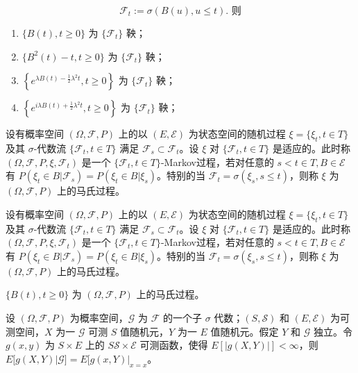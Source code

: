 \documentclass[lang=cn,10pt,thmcnt=section]{elegantbook}
\begin{document}
\begin{theorem}
	\[
\mathcal{F}_t := \sigma(B(u), u \leq t). \text{ 则}
\]
\begin{enumerate}
    \item $\{B(t), t \geq 0\}$ 为 $\{\mathcal{F}_t\}$ 鞅；
    \item $\{B^2(t) - t, t \geq 0\}$ 为 $\{\mathcal{F}_t\}$ 鞅；
    \item $\left\{e^{\lambda B(t) - \frac{1}{2} \lambda^2 t}, t \geq 0\right\}$ 为 $\{\mathcal{F}_t\}$ 鞅；
    \item $\left\{e^{i \lambda B(t) + \frac{1}{2} \lambda^2 t}, t \geq 0\right\}$ 为 $\{\mathcal{F}_t\}$ 鞅；
\end{enumerate}
\end{theorem}
\begin{definition}
	设有概率空间 $(\Omega, \mathcal{F}, P)$ 上的以 $(E, \mathcal{E})$ 为状态空间的随机过程 $\xi = \{\xi_t, t \in T\}$ 及其 $\sigma$-代数流 $\{\mathcal{F}_t, t \in T\}$ 满足 $\mathcal{F}_s \subset \mathcal{F}_t$。设 $\xi$ 对 $\{\mathcal{F}_t, t \in T\}$ 是适应的。此时称 $(\Omega, \mathcal{F}, P, \xi, \mathcal{F}_t)$ 是一个 $\{\mathcal{F}_t, t \in T\}$-Markov过程，若对任意的 $s < t \in T, B \in \mathcal{E}$ 有 $P(\xi_t \in B | \mathcal{F}_s) = P(\xi_t \in B | \xi_s)$。特别的当 $\mathcal{F}_t = \sigma(\xi_s, s \leq t)$，则称 $\xi$ 为 $(\Omega, \mathcal{F}, P)$ 上的马氏过程。
\end{definition}
\begin{definition}
	设有概率空间 $(\Omega, \mathcal{F}, P)$ 上的以 $(E, \mathcal{E})$ 为状态空间的随机过程 $\xi = \{\xi_t, t \in T\}$ 及其 $\sigma$-代数流 $\{\mathcal{F}_t, t \in T\}$ 满足 $\mathcal{F}_s \subset \mathcal{F}_t$。设 $\xi$ 对 $\{\mathcal{F}_t, t \in T\}$ 是适应的。此时称 $(\Omega, \mathcal{F}, P, \xi, \mathcal{F}_t)$ 是一个 $\{\mathcal{F}_t, t \in T\}$-Markov过程，若对任意的 $s < t \in T, B \in \mathcal{E}$ 有 $P(\xi_t \in B | \mathcal{F}_s) = P(\xi_t \in B | \xi_s)$。特别的当 $\mathcal{F}_t = \sigma(\xi_s, s \leq t)$，则称 $\xi$ 为 $(\Omega, \mathcal{F}, P)$ 上的马氏过程。
\end{definition}
\begin{theorem}
	$\{B(t), t \geq 0\}$ 为 $(\Omega, \mathcal{F}, P)$ 上的马氏过程。
\end{theorem}
\begin{theorem}
	设 $(\Omega, \mathcal{F}, P)$ 为概率空间，$\mathcal{G}$ 为 $\mathcal{F}$ 的一个子 $\sigma$ 代数；$(S, \mathcal{S})$ 和 $(E, \mathcal{E})$ 为可测空间，$X$ 为一 $\mathcal{G}$ 可测 $S$ 值随机元，$Y$ 为一 $E$ 值随机元。假定 $Y$ 和 $\mathcal{G}$ 独立。令 $g(x, y)$ 为 $S \times E$ 上的 $S \mathcal{S} \times \mathcal{E}$ 可测函数，使得 $E[|g(X, Y)|] < \infty$，则 $E[g(X, Y) | \mathcal{G}] = E[g(x, Y)|_{x=x}$。
\end{theorem}
\end{document}

